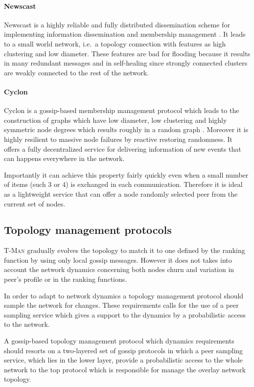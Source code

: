 \paragraph{Newscast} Newscast is a highly reliable and fully distributed dissemination scheme for implementing information dissemination and membership management \cite{JKvS03}. It leads to a small world network, i.e.\ a topology connection with features as high clustering and low diameter. These features are bad for flooding because it results in many redundant messages and in self-healing since strongly connected clusters are weakly connected to the rest of the network.

\paragraph{Cyclon} Cyclon is a gossip-based membership management protocol which leads to the construction of graphs which have low diameter, low clustering and highly symmetric node degrees which results roughly in a random graph \cite{VGvS05}. Moreover it is highly resilient to massive node failures by reactive restoring randomness. It offers a fully decentralized service for delivering information of new events that can happens everywhere in the network.

Importantly it can achieve this property fairly quickly even when a small number of items (such $3$ or $4$) is exchanged in each communication. Therefore it is ideal as a lightweight service that can offer a node randomly selected peer from the current set of nodes. 


\subsection{\label{subsec:vicinity}Topology management protocols}

\textsc{T-Man} \cite{JB04} gradually evolves the topology to match it to one defined by the ranking function by using only local gossip messages. However it does not takes into account the network dynamics concerning both nodes churn and variation in peer's profile or in the ranking functions. 

In order to adapt to network dynamics a topology management protocol should sample the network for changes. These requirements calls for the use of a peer sampling service which gives a support to the dynamics by a probabilistic access to the network.

A gossip-based topology management protocol which dynamics requirements should resorts on a two-layered set of gossip protocols in which a peer sampling service, which lies in the lower layer, provide a probabilistic access to the whole network to the top protocol which is responsible for manage the overlay network topology.

